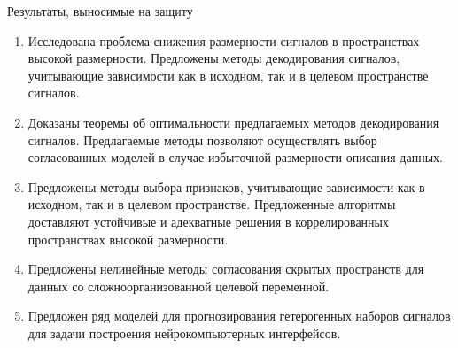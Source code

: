 \documentclass[10pt]{beamer}
\begin{document}
\begin{frame}{Результаты, выносимые на защиту}
\begin{enumerate}
	\item Исследована проблема снижения размерности сигналов в пространствах высокой размерности. 
	Предложены методы декодирования сигналов, учитывающие зависимости как в исходном, так и в целевом пространстве сигналов.
	\vfill
	\item Доказаны теоремы об оптимальности предлагаемых методов декодирования сигналов. Предлагаемые методы позволяют осуществлять выбор согласованных моделей в случае избыточной размерности описания данных.
	\vfill 
	\item Предложены методы выбора признаков, учитывающие зависимости как в исходном, так и в целевом пространстве. Предложенные алгоритмы доставляют устойчивые и адекватные решения в коррелированных пространствах высокой размерности.
	\vfill
	\item Предложены нелинейные методы согласования скрытых пространств для данных со сложноорганизованной целевой переменной.
	\vfill
	\item Предложен ряд моделей для прогнозирования гетерогенных наборов сигналов для задачи построения нейрокомпьютерных интерфейсов.
\end{enumerate}
\end{frame}
\end{document}
